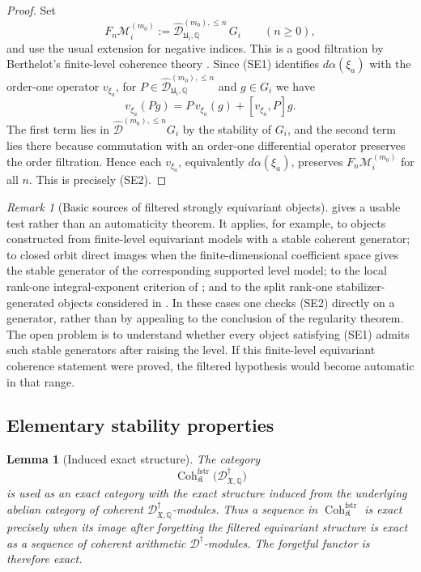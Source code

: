 \documentclass[11pt]{amsart}
\theoremstyle{plain}
\newtheorem{lemma}{Lemma}[section]
\theoremstyle{definition}
\theoremstyle{remark}
\newtheorem{remark}{Remark}[section]
\newcommand{\Coh}{\operatorname{Coh}}
\newcommand{\fstr}{\mathrm{fstr}}
\begin{document}
\begin{proof}
Set
\[
  F_n\mathcal M_i^{(m_0)}:=
  \widehat{\mathscr D}^{(m_0),\le n}_{\mathfrak U_i,\mathbb Q}\,G_i
  \qquad(n\ge0),
\]
and use the usual extension for negative indices.  This is a good filtration by
Berthelot's finite-level coherence theory
\cite[5.3.2--5.3.4]{BerthelotIntro}.  Since \textup{(SE1)} identifies
\(d\alpha(\xi_a)\) with the order-one operator \(v_{\xi_a}\), for
\(P\in\widehat{\mathscr D}^{(m_0),\le n}_{\mathfrak U_i,\mathbb Q}\) and
\(g\in G_i\) we have
\[
  v_{\xi_a}(Pg)=P\,v_{\xi_a}(g)+[v_{\xi_a},P]g.
\]
The first term lies in
\(\widehat{\mathscr D}^{(m_0),\le n}G_i\) by the stability of \(G_i\), and the
second term lies there because commutation with an order-one differential
operator preserves the order filtration.  Hence each \(v_{\xi_a}\), equivalently
\(d\alpha(\xi_a)\), preserves \(F_n\mathcal M_i^{(m_0)}\) for all \(n\).  This is
precisely \textup{(SE2)}.
\end{proof}

\begin{remark}[Basic sources of filtered strongly equivariant objects]
\label{rem:sources-of-SE2}
 gives a usable test rather than an
automaticity theorem.  It applies, for example, to objects constructed from
finite-level equivariant models with a stable coherent generator; to closed
orbit direct images when the finite-dimensional coefficient space gives the
stable generator of the corresponding supported level model; to the local
rank-one integral-exponent criterion of
; and to the split rank-one
stabilizer-generated objects considered in .  In these cases
one checks \textup{(SE2)} directly on a generator, rather than by appealing to
the conclusion of the regularity theorem.  The open problem is to
understand whether every object satisfying \textup{(SE1)} admits such stable
generators after raising the level.  If this finite-level equivariant coherence
statement were proved, the filtered hypothesis would become automatic in that
range.
\end{remark}

\subsection{Elementary stability properties}

\begin{lemma}[Induced exact structure]
\label{lem:strong-equivariant-abelian}
The category
\[
  \Coh^{\fstr}_{\mathfrak K}
  \bigl(\mathscr D^\dagger_{\mathfrak X,\mathbb Q}\bigr)
\]
is used as an exact category with the exact structure induced from the
underlying abelian category of coherent
\(\mathscr D^\dagger_{\mathfrak X,\mathbb Q}\)-modules.  Thus a sequence in
\(\Coh^{\fstr}_{\mathfrak K}\) is exact precisely when its image after
forgetting the filtered equivariant structure is exact as a sequence of
coherent arithmetic \(\mathscr D^\dagger\)-modules.  The forgetful functor is
therefore exact.
\end{lemma}
\end{document}
